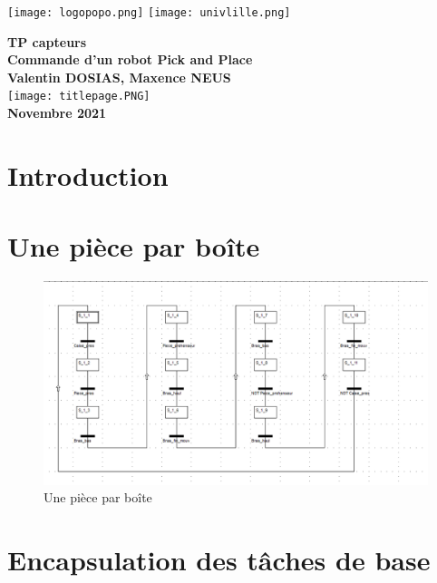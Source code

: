 \documentclass[oneside,a4paper,12pt]{article}
\begin{document}
	\begin{titlepage}
		\texttt{[image: logopopo.png]}
		\hspace*{\fill}
		\texttt{[image: univlille.png]}
		
		\begin{center}
			\vspace{1cm}
			\textbf{TP capteurs}\\
			\textbf{Commande d'un robot Pick and Place}\\
			\vspace{1cm}
			\textbf{Valentin DOSIAS, Maxence NEUS}\\
			\vspace{3cm}
			\texttt{[image: titlepage.PNG]}\\
			\vspace{\fill}
			\textbf{Novembre 2021}\\
		\end{center}
	\end{titlepage}
	
	\tableofcontents
	\newpage
	
	\section{Introduction}
	
	\section{Une pièce par boîte}
		\begin{figure}[h]
			\centering
			\includegraphics[width=15cm]{grafcet1.PNG}
			\caption{Une pièce par boîte}
		\end{figure}
	
	\section{Encapsulation des tâches de base}
\end{document}
